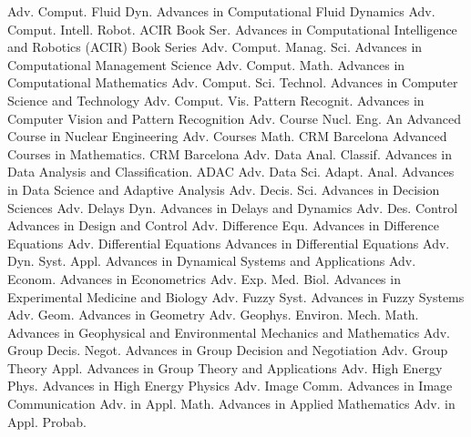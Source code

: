 {Adv. Comput. Fluid Dyn.}
{Advances in Computational Fluid Dynamics}
{Adv. Comput. Intell. Robot. ACIR Book Ser.}
{Advances in Computational Intelligence and Robotics (ACIR) Book Series}
{Adv. Comput. Manag. Sci.}
{Advances in Computational Management Science}
{Adv. Comput. Math.}
{Advances in Computational Mathematics}
{Adv. Comput. Sci. Technol.}
{Advances in Computer Science and Technology}
{Adv. Comput. Vis. Pattern Recognit.}
{Advances in Computer Vision and Pattern Recognition}
{Adv. Course Nucl. Eng.}
{An Advanced Course in Nuclear Engineering}
{Adv. Courses Math. CRM Barcelona}
{Advanced Courses in Mathematics. CRM Barcelona}
{Adv. Data Anal. Classif.}
{Advances in Data Analysis and Classification. ADAC}
{Adv. Data Sci. Adapt. Anal.}
{Advances in Data Science and Adaptive Analysis}
{Adv. Decis. Sci.}
{Advances in Decision Sciences}
{Adv. Delays Dyn.}
{Advances in Delays and Dynamics}
{Adv. Des. Control}
{Advances in Design and Control}
{Adv. Difference Equ.}
{Advances in Difference Equations}
{Adv. Differential Equations}
{Advances in Differential Equations}
{Adv. Dyn. Syst. Appl.}
{Advances in Dynamical Systems and Applications}
{Adv. Econom.}
{Advances in Econometrics}
{Adv. Exp. Med. Biol.}
{Advances in Experimental Medicine and Biology}
{Adv. Fuzzy Syst.}
{Advances in Fuzzy Systems}
{Adv. Geom.}
{Advances in Geometry}
{Adv. Geophys. Environ. Mech. Math.}
{Advances in Geophysical and Environmental Mechanics and Mathematics}
{Adv. Group Decis. Negot.}
{Advances in Group Decision and Negotiation}
{Adv. Group Theory Appl.}
{Advances in Group Theory and Applications}
{Adv. High Energy Phys.}
{Advances in High Energy Physics}
{Adv. Image Comm.}
{Advances in Image Communication}
{Adv. in Appl. Math.}
{Advances in Applied Mathematics}
{Adv. in Appl. Probab.}

